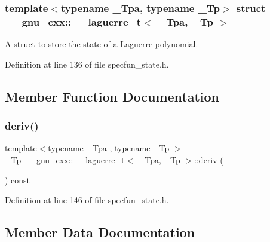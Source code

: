 \subsubsection*{template$<$typename \+\_\+\+Tpa, typename \+\_\+\+Tp$>$\newline
struct \+\_\+\+\_\+gnu\+\_\+cxx\+::\+\_\+\+\_\+laguerre\+\_\+t$<$ \+\_\+\+Tpa, \+\_\+\+Tp $>$}

A struct to store the state of a Laguerre polynomial. 

Definition at line 136 of file specfun\+\_\+state.\+h.



\subsection{Member Function Documentation}
\mbox{\label{struct____gnu__cxx_1_1____laguerre__t_aed1a4e46a049188de5ca6c2cc9bc5cdf}} 
\subsubsection{\texorpdfstring{deriv()}{deriv()}}
{\footnotesize\ttfamily template$<$typename \+\_\+\+Tpa , typename \+\_\+\+Tp $>$ \\
\+\_\+\+Tp \hyperlink{struct____gnu__cxx_1_1____laguerre__t}{\+\_\+\+\_\+gnu\+\_\+cxx\+::\+\_\+\+\_\+laguerre\+\_\+t}$<$ \+\_\+\+Tpa, \+\_\+\+Tp $>$\+::deriv (\begin{DoxyParamCaption}{ }\end{DoxyParamCaption}) const\hspace{0.3cm}{\ttfamily [inline]}}



Definition at line 146 of file specfun\+\_\+state.\+h.



\subsection{Member Data Documentation}
\mbox{\label{struct____gnu__cxx_1_1____laguerre__t_a8aa1b08deed3b739c3de21953f2c5494}} 

